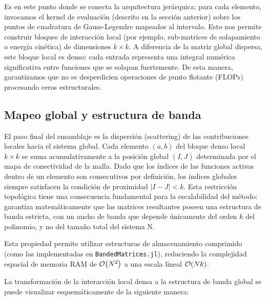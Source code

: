 \documentclass[12pt, a4paper, oneside, spanish]{article}
\begin{document}
Es en este punto donde se conecta la arquitectura jerárquica: para cada elemento, invocamos el kernel de evaluación (descrito en la sección anterior) sobre los puntos de cuadratura de Gauss-Legendre mapeados al intervalo. Esto nos permite construir bloques de interacción local (por ejemplo, sub-matrices de solapamiento o energía cinética) de dimensiones \( k \times k \). A diferencia de la matriz global dispersa, este bloque local es denso: cada entrada representa una integral numérica significativa entre funciones que se solapan fuertemente. De esta manera, garantizamos que no se desperdicien operaciones de punto flotante (FLOPs) procesando ceros estructurales.

\subsection{Mapeo global y estructura de banda}

El paso final del ensamblaje es la dispersión (scattering) de las contribuciones locales hacia el sistema global. Cada elemento \( (a,b) \) del bloque denso local \( k\times k \) se suma acumulativamente a la posición global \( (I,J) \) determinada por el mapa de conectividad de la malla.
Dado que los índices de las funciones activas dentro de un elemento son consecutivos por definición, los índices globales siempre satisfacen la condición de proximidad \( |I-J| < k \). Esta restricción topológica tiene una consecuencia fundamental para la escalabilidad del método: garantiza matemáticamente que las matrices resultantes poseen una estructura de banda estricta, con un ancho de banda que depende únicamente del orden \( k \) del polinomio, y no del tamaño total del sistema N.

Esta propiedad permite utilizar estructuras de almacenamiento comprimido (como las implementadas en \texttt{BandedMatrices.jl}), reduciendo la complejidad espacial de memoria RAM de \( \order{N^2} \) a una escala lineal \( \order{Nk} \).

La transformación de la interacción local densa a la estructura de banda global se puede visualizar esquemáticamente de la siguiente manera:
\end{document}
